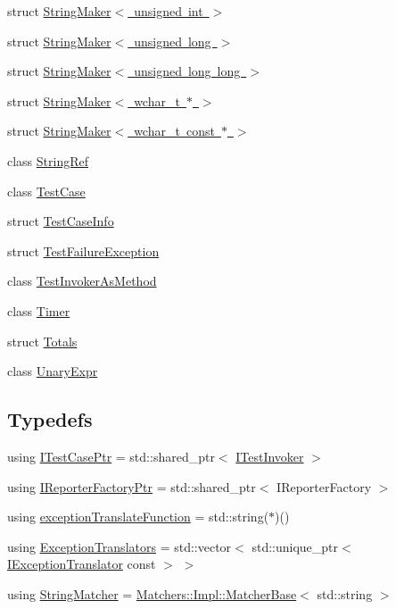 \begin{DoxyCompactItemize}
\item 
struct \mbox{\hyperlink{structCatch_1_1StringMaker_3_01unsigned_01int_01_4}{String\+Maker$<$ unsigned int $>$}}
\item 
struct \mbox{\hyperlink{structCatch_1_1StringMaker_3_01unsigned_01long_01_4}{String\+Maker$<$ unsigned long $>$}}
\item 
struct \mbox{\hyperlink{structCatch_1_1StringMaker_3_01unsigned_01long_01long_01_4}{String\+Maker$<$ unsigned long long $>$}}
\item 
struct \mbox{\hyperlink{structCatch_1_1StringMaker_3_01wchar__t_01_5_01_4}{String\+Maker$<$ wchar\+\_\+t $\ast$ $>$}}
\item 
struct \mbox{\hyperlink{structCatch_1_1StringMaker_3_01wchar__t_01const_01_5_01_4}{String\+Maker$<$ wchar\+\_\+t const $\ast$ $>$}}
\item 
class \mbox{\hyperlink{classCatch_1_1StringRef}{String\+Ref}}
\item 
class \mbox{\hyperlink{classCatch_1_1TestCase}{Test\+Case}}
\item 
struct \mbox{\hyperlink{structCatch_1_1TestCaseInfo}{Test\+Case\+Info}}
\item 
struct \mbox{\hyperlink{structCatch_1_1TestFailureException}{Test\+Failure\+Exception}}
\item 
class \mbox{\hyperlink{classCatch_1_1TestInvokerAsMethod}{Test\+Invoker\+As\+Method}}
\item 
class \mbox{\hyperlink{classCatch_1_1Timer}{Timer}}
\item 
struct \mbox{\hyperlink{structCatch_1_1Totals}{Totals}}
\item 
class \mbox{\hyperlink{classCatch_1_1UnaryExpr}{Unary\+Expr}}
\end{DoxyCompactItemize}
\subsection*{Typedefs}
\begin{DoxyCompactItemize}
\item 
using \mbox{\hyperlink{namespaceCatch_afa04ebe8e9423240c9585f7101a82ddf}{I\+Test\+Case\+Ptr}} = std\+::shared\+\_\+ptr$<$ \mbox{\hyperlink{structCatch_1_1ITestInvoker}{I\+Test\+Invoker}} $>$
\item 
using \mbox{\hyperlink{namespaceCatch_ad1b36ac40c2739e52fd453dcdddf0d09}{I\+Reporter\+Factory\+Ptr}} = std\+::shared\+\_\+ptr$<$ I\+Reporter\+Factory $>$
\item 
using \mbox{\hyperlink{namespaceCatch_ae8d8673884dc36b98875106322a2a37b}{exception\+Translate\+Function}} = std\+::string($\ast$)()
\item 
using \mbox{\hyperlink{namespaceCatch_a7ad07967e688fdc03cf784f58be4b741}{Exception\+Translators}} = std\+::vector$<$ std\+::unique\+\_\+ptr$<$ \mbox{\hyperlink{structCatch_1_1IExceptionTranslator}{I\+Exception\+Translator}} const  $>$ $>$
\item 
using \mbox{\hyperlink{namespaceCatch_aba438977e831821a2eeca82b9b4f4af2}{String\+Matcher}} = \mbox{\hyperlink{structCatch_1_1Matchers_1_1Impl_1_1MatcherBase}{Matchers\+::\+Impl\+::\+Matcher\+Base}}$<$ std\+::string $>$
\end{DoxyCompactItemize}
